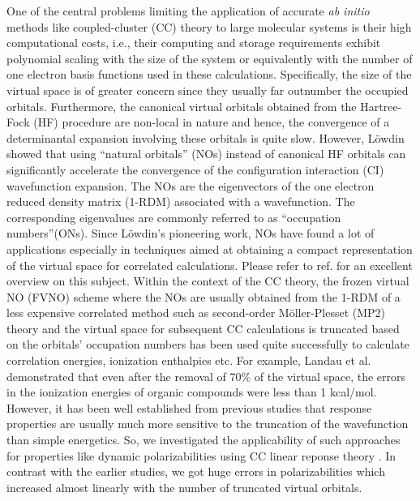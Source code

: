 One of the central problems limiting the application of accurate {\em ab
initio} methods like coupled-cluster (CC) theory to large molecular systems is their high 
computational costs, i.e., their computing and storage requirements 
exhibit polynomial scaling with the size of the system or equivalently
with the number of one electron basis functions used in these calculations.
Specifically, the size of the virtual space is of greater concern since  
they usually far outnumber the occupied orbitals. Furthermore, the canonical virtual orbitals
obtained from the Hartree-Fock (HF) procedure are non-local in nature and hence, 
the convergence of a determinantal expansion involving these orbitals
is quite slow. However, L{\"o}wdin \cite{Lowdin55}showed that using 
``natural orbitals'' (NOs) instead of canonical HF orbitals can significantly 
accelerate the convergence of the configuration interaction (CI)
wavefunction expansion. The NOs are the eigenvectors of the 
one electron reduced density matrix (1-RDM) associated with a wavefunction. 
The corresponding eigenvalues are commonly referred to 
as ``occupation numbers''(ONs). Since L{\"o}wdin's pioneering 
work, NOs have found a lot of applications especially in techniques 
aimed at obtaining a compact representation of the virtual space for 
correlated calculations.\cite{Sosa89,Taube05,Taube08,Landau10,DePrince13:FNOs,DePrince13} 
Please refer to ref.\cite{Landau10} for an excellent overview on this subject. 
Within the context of the CC theory, the frozen virtual NO (FVNO) scheme where 
the NOs are usually obtained from the 1-RDM of a less expensive correlated method 
such as second-order M{\"o}ller-Plesset (MP2) theory and the virtual space for subsequent 
CC calculations is truncated based on the orbitals' occupation 
numbers has been used quite successfully to calculate correlation energies, 
ionization enthalpies etc. For example, Landau et al.\cite{Landau10} demonstrated 
that even after the removal of 70\% of the virtual space, the errors in
the ionization energies of organic compounds were less than 1 kcal/mol.
However, it has been well established from previous studies that response 
properties are usually much more sensitive to the truncation of the wavefunction 
than simple energetics\cite{Korona04,Russ04,Russ08,McAlexander12,Friedrich15,McAlexander15:LRCC}. 
So, we investigated the applicability of such 
approaches for properties like dynamic polarizabilities using CC linear reponse theory
\cite{Koch90}. In contrast with the earlier studies\cite{Kumar17}, we got huge errors in polarizabilities 
which increased almost linearly with the number of truncated virtual orbitals. 
